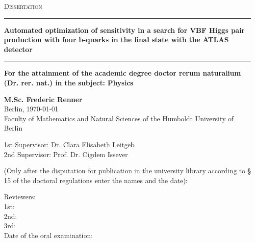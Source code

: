 
\begin{titlepage}
    \begin{center}
	{\scshape\Large Dissertation\\}
	\vspace{.1cm}
	\rule[1pt]{\textwidth}{1.5pt}
    \LARGE{\textbf{Automated optimization of sensitivity in a search for VBF Higgs pair production with four b-quarks in the final state with the ATLAS detector
	}}
    \rule[11pt]{\textwidth}{1.5pt}
	
    {\normalsize\textbf{For the attainment of the academic degree doctor rerum naturalium (Dr. rer. nat.) in the subject: Physics}} 
    \vspace{1cm}

    \Large{\textbf{M.Sc. Frederic Renner\\}}
	Berlin, \today\\
    \vspace{1cm}
    \large
	Faculty of Mathematics and Natural Sciences of the Humboldt University of Berlin\\
    \vspace{1cm}

	1st Supervisor: Dr. Clara Elisabeth Leitgeb\\
	2nd Supervisor: Prof. Dr. Cigdem Issever
	\vspace{01cm}


	\newpage 
	(Only after the disputation for publication in the university library according to § 15	of the doctoral regulations enter the names and the date):\\
	\raggedright
	Reviewers: \\
	1st: \\
	2nd: \\
	3rd: \\
	
	Date of the oral examination: 
\end{center}
\end{titlepage}